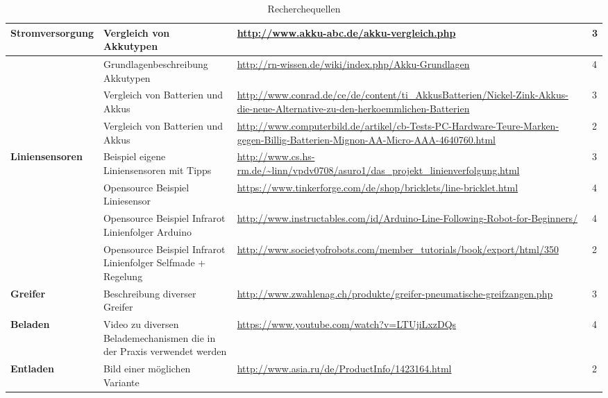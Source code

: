\begin{table}[h]
\begin{tabular}{|p{3cm}|p{3.5cm}|p{5cm}|p{2cm}|}
\textbf{Stromversorgung}	&	Vergleich von Akkutypen	&	\url{http://www.akku-abc.de/akku-vergleich.php}	&	3 \\\hline
				 			&	Grundlagenbeschreibung Akkutypen 	&	\url{http://rn-wissen.de/wiki/index.php/Akku-Grundlagen}	&	4 \\\hline
				 			&	Vergleich von Batterien und Akkus	&	\url{http://www.conrad.de/ce/de/content/ti_AkkusBatterien/Nickel-Zink-Akkus-die-neue-Alternative-zu-den-herkoemmlichen-Batterien}	&	3 \\\hline
				 			&	Vergleich von Batterien und Akkus	&	\url{http://www.computerbild.de/artikel/cb-Tests-PC-Hardware-Teure-Marken-gegen-Billig-Batterien-Mignon-AA-Micro-AAA-4640760.html } & 2	\\\hline
				 			
\textbf{Liniensensoren}	&	Beispiel eigene Liniensensoren mit Tipps	&	\url{http://www.cs.hs-rm.de/~linn/vpdv0708/asuro1/das_projekt_linienverfolgung.html}	&	3 \\\hline
				 			&	Opensource Beispiel Liniesensor	&	\url{https://www.tinkerforge.com/de/shop/bricklets/line-bricklet.html}	&	4 \\\hline
 				 			&	Opensource Beispiel Infrarot Linienfolger Arduino	&	\url{http://www.instructables.com/id/Arduino-Line-Following-Robot-for-Beginners/}	&	4 \\\hline
 				 			&	Opensource Beispiel Infrarot Linienfolger Selfmade + Regelung	&	\url{http://www.societyofrobots.com/member_tutorials/book/export/html/350}	&	2 \\\hline
\textbf{Greifer}	& 	Beschreibung diverser Greifer & \url{http://www.zwahlenag.ch/produkte/greifer-pneumatische-greifzangen.php} & 3 \\\hline	
\textbf{Beladen}	& 	Video zu diversen Belademechanismen die in der Praxis verwendet werden & \url{https://www.youtube.com/watch?v=LTUjiLxzDQs} & 4 \\\hline
\textbf{Entladen}	& 	Bild einer möglichen Variante & \url{http://www.asia.ru/de/ProductInfo/1423164.html} & 2 \\\hline	
\end{tabular}\\
\caption{Recherchequellen}
\end{table}